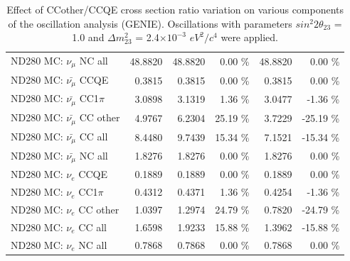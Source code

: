 \begin{table}
\begin{tabular}{| l | r | r  r | r  r |}
                                          ND280 MC: $\nu_{\mu}$ NC all &         48.8820 &         48.8820 &  0.00 \%  &         48.8820 &  0.00 \%  \\ 
                                      ND280 MC: $\bar{\nu_{\mu}}$ CCQE &          0.3815 &          0.3815 &  0.00 \%  &          0.3815 &  0.00 \%  \\ 
                                  ND280 MC: $\bar{\nu_{\mu}}$ CC1$\pi$ &          3.0898 &          3.1319 &  1.36 \%  &          3.0477 & -1.36 \%  \\ 
                                  ND280 MC: $\bar{\nu_{\mu}}$ CC other &          4.9767 &          6.2304 & 25.19 \%  &          3.7229 & -25.19 \%  \\ 
                                    ND280 MC: $\bar{\nu_{\mu}}$ CC all &          8.4480 &          9.7439 & 15.34 \%  &          7.1521 & -15.34 \%  \\ 
                                    ND280 MC: $\bar{\nu_{\mu}}$ NC all &          1.8276 &          1.8276 &  0.00 \%  &          1.8276 &  0.00 \%  \\ 
                                              ND280 MC: $\nu_{e}$ CCQE &          0.1889 &          0.1889 &  0.00 \%  &          0.1889 &  0.00 \%  \\ 
                                          ND280 MC: $\nu_{e}$ CC1$\pi$ &          0.4312 &          0.4371 &  1.36 \%  &          0.4254 & -1.36 \%  \\ 
                                          ND280 MC: $\nu_{e}$ CC other &          1.0397 &          1.2974 & 24.79 \%  &          0.7820 & -24.79 \%  \\ 
                                            ND280 MC: $\nu_{e}$ CC all &          1.6598 &          1.9233 & 15.88 \%  &          1.3962 & -15.88 \%  \\ 
                                            ND280 MC: $\nu_{e}$ NC all &          0.7868 &          0.7868 &  0.00 \%  &          0.7868 &  0.00 \%  \\ 
\hline
\end{tabular}
\caption{ 
  Effect of CCother/CCQE cross section ratio variation
  on various components of the oscillation analysis (GENIE).
  Oscillations with parameters $sin^{2}2\theta_{23}$ = 1.0 and $\Delta m^{2}_{23}$ = 2.4$\times10^{-3}$ $eV^{2}/c^{4}$ were applied.  
}
\label{tab:genie_xsec_ccoth_to_ccqe}
\end{table}


%
%
%
%

